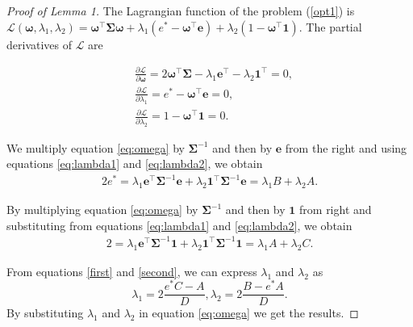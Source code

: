 \documentclass[10pt,a4paper]{amsart}
\begin{document}
\begin{proof}[Proof of Lemma 1]
The Lagrangian function of the problem (\ref{opt1}) is $\mathcal{L}(\boldsymbol{\omega}, \lambda_1, \lambda_2) = \boldsymbol{\omega}^\top \mathbf{\Sigma} \boldsymbol{\omega} + \lambda_1 \left( e^* - \boldsymbol{\omega}^\top \mathbf{e} \right) + \lambda_2 \left( 1 - \boldsymbol{\omega}^\top \mathbf{1} \right)$. The partial derivatives of $\mathcal{L}$ are 

\begin{align} 
&\frac{\partial \mathcal{L}}{\partial \boldsymbol{\omega}} = 2 \boldsymbol{\omega}^\top \mathbf{\Sigma} - \lambda_1 \mathbf{e^\top} - \lambda_2 \mathbf{1^\top} = 0, \label{eq:omega} \\ 
& \frac{\partial \mathcal{L}}{\partial \lambda_1} = e^* - \boldsymbol{\omega}^\top \mathbf{e} = 0, \label{eq:lambda1} \\ 
&\frac{\partial \mathcal{L}}{\partial \lambda_2} = 1 - \boldsymbol{\omega}^\top \mathbf{1} = 0. \label{eq:lambda2} 
\end{align}

We multiply equation \eqref{eq:omega} by $\mathbf{\Sigma}^{-1}$ and then by $\mathbf{e}$ from the right and using equations \eqref{eq:lambda1} and \eqref{eq:lambda2}, we obtain
\begin{equation} 
\begin{aligned} \label{first}
    2e^* = \lambda_1 \mathbf{e^\top} \mathbf{\Sigma}^{-1} \mathbf{e} + \lambda_2 \mathbf{1^\top} \mathbf{\Sigma}^{-1} \mathbf{e}
          = \lambda_1 B + \lambda_2 A.
\end{aligned}
\end{equation}

By multiplying equation \eqref{eq:omega} by $\mathbf{\Sigma}^{-1}$ and then by $\mathbf{1}$ from right and substituting from equations \eqref{eq:lambda1} and \eqref{eq:lambda2}, we obtain
\begin{equation} 
\begin{aligned} \label{second}
    2 = \lambda_1 \mathbf{e^\top} \mathbf{\Sigma}^{-1}\mathbf{1}  + \lambda_2 \mathbf{1^\top} \mathbf{\Sigma}^{-1} \mathbf{1} 
          = \lambda_1 A + \lambda_2 C.
\end{aligned}
\end{equation}


From equations \eqref{first} and \eqref{second}, we can express $\lambda_1$ and $\lambda_2$ as
\begin{equation}
    \lambda_1 = 2\frac{e^* C-A}{D}, \lambda_2 = 2\frac{B - e^* A}{D}.
\end{equation}
By substituting $ \lambda_1$ and $ \lambda_2$ in equation \eqref{eq:omega} we get the results.
\end{proof}
\end{document}
